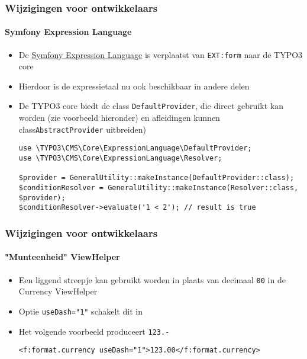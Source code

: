 \begin{frame}[fragile]
	\frametitle{Wijzigingen voor ontwikkelaars}
	\framesubtitle{Symfony Expression Language}

	\lstset{basicstyle=\tiny\ttfamily}

	\begin{itemize}
		\item De \href{https://symfony.com/doc/current/components/expression_language/syntax.html}{Symfony Expression Language}
			is verplaatst van \texttt{EXT:form} naar de TYPO3 core
		\item Hierdoor is de expressietaal nu ook beschikbaar in andere delen
		\item De TYPO3 core biedt de class \texttt{DefaultProvider}, die direct gebruikt kan worden
			(zie voorbeeld hieronder) en afleidingen kunnen class\texttt{AbstractProvider} uitbreiden)

			\begin{lstlisting}
use \TYPO3\CMS\Core\ExpressionLanguage\DefaultProvider;
use \TYPO3\CMS\Core\ExpressionLanguage\Resolver;

$provider = GeneralUtility::makeInstance(DefaultProvider::class);
$conditionResolver = GeneralUtility::makeInstance(Resolver::class, $provider);
$conditionResolver->evaluate('1 < 2'); // result is true
			\end{lstlisting}

	\end{itemize}

\end{frame}


\begin{frame}[fragile]
	\frametitle{Wijzigingen voor ontwikkelaars}
	\framesubtitle{"Munteenheid" ViewHelper}


	\begin{itemize}
		\item Een liggend streepje kan gebruikt worden in plaats van
			decimaal \texttt{00} in de Currency ViewHelper
		\item Optie \texttt{useDash="1"} schakelt dit in
		\item Het volgende voorbeeld produceert \texttt{123.-}

			\begin{lstlisting}
<f:format.currency useDash="1">123.00</f:format.currency>
			\end{lstlisting}

	\end{itemize}

\end{frame}

